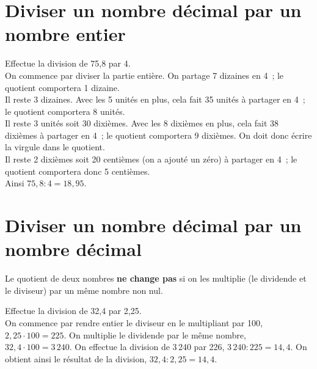 \section{Diviser un nombre décimal par un nombre entier}

\begin{exemple*1}
Effectue la division de 75,8 par 4.\\[1em]
On commence par diviser la partie entière. On partage 7 dizaines en 4 ; le quotient comportera 1 dizaine.\\[0.75em]
Il reste 3 dizaines. Avec les 5 unités en plus, cela fait 35 unités à partager en 4 ; le quotient comportera 8 unités. \\[0.75em]
Il reste 3 unités soit 30 dixièmes. Avec les 8 dixièmes en plus, cela fait 38 dixièmes à partager en 4 ; le quotient comportera 9 dixièmes. On doit donc écrire la virgule dans le quotient.\\[0.75em]
Il reste 2 dixièmes soit 20 centièmes (on a ajouté un zéro) à partager en 4 ; le quotient comportera donc 5 centièmes.\\[0.75em]
Ainsi $75,8 : 4 = 18,95$.
\end{exemple*1}


\section{Diviser un nombre décimal par un nombre décimal}

\begin{aconnaitre}
Le quotient de deux nombres \textbf{ne change pas} si on les multiplie (le dividende et le diviseur) par un même nombre non nul.
\end{aconnaitre}

\begin{exemple*1}
Effectue la division de 32,4 par 2,25.\\[1em]
On commence par rendre entier le diviseur en le multipliant par 100, $2,25 \cdot 100 = 225$. On multiplie le dividende par le même nombre, $32,4 \cdot 100 = 3\,240$. On effectue la division de 3\,240  par 226, $3\,240 : 225 = 14,4$. On obtient ainsi le résultat de la division, $32,4 : 2,25 = 14,4$. %
\end{exemple*1}


